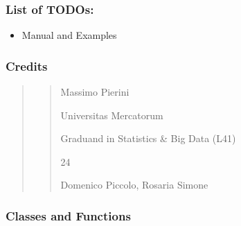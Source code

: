 \documentclass[letterpaper,10pt,english]{sphinxmanual}
\begin{document}
\subsubsection{List of TODOs:}
\label{\detokenize{cubmods:id330}}\begin{itemize}
\item {} 
\sphinxAtStartPar
Manual and Examples

\end{itemize}


\subsubsection{Credits}
\label{\detokenize{cubmods:id331}}\begin{quote}
\begin{quote}\begin{description}
\sphinxAtStartPar
Massimo Pierini

\sphinxAtStartPar
Universitas Mercatorum

\sphinxAtStartPar
Graduand in Statistics \& Big Data (L41)

\sphinxhyphen{}24

\sphinxAtStartPar
Domenico Piccolo, Rosaria Simone

\sphinxAtStartPar
{}

\end{description}\end{quote}
\end{quote}


\subsubsection{Classes and Functions}
\label{\detokenize{cubmods:id332}}
\end{document}
